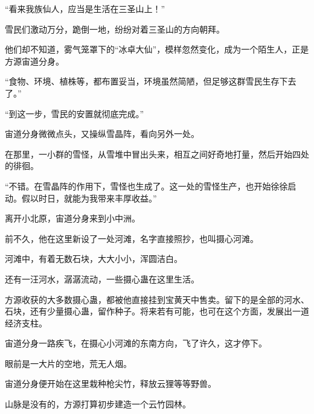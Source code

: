 \begin{this_body}
“看来我族仙人，应当是生活在三圣山上！”

雪民们激动万分，跪倒一地，纷纷对着三圣山的方向朝拜。

他们却不知道，雾气笼罩下的“冰卓大仙”，模样忽然变化，成为一个陌生人，正是方源宙道分身。

“食物、环境、植株等，都布置妥当，环境虽然简陋，但足够这群雪民生存下去了。”

“到这一步，雪民的安置就彻底完成。”

宙道分身微微点头，又操纵雪晶阵，看向另外一处。

在那里，一小群的雪怪，从雪堆中冒出头来，相互之间好奇地打量，然后开始四处的徘徊。

“不错。在雪晶阵的作用下，雪怪也生成了。这一处的雪怪生产，也开始徐徐启动。假以时日，就能为我带来丰厚收益。”

离开小北原，宙道分身来到小中洲。

前不久，他在这里新设了一处河滩，名字直接照抄，也叫摄心河滩。

河滩中，有着无数石块，大大小小，浑圆洁白。

还有一汪河水，潺潺流动，一些摄心蛊在这里生活。

方源收获的大多数摄心蛊，都被他直接挂到宝黄天中售卖。留下的是全部的河水、石块，还有少量摄心蛊，留作种子。将来若有可能，也可在这个方面，发展出一道经济支柱。

宙道分身一路疾飞，在摄心小河滩的东南方向，飞了许久，这才停下。

眼前是一大片的空地，荒无人烟。

宙道分身便开始在这里栽种枪尖竹，释放云狸等等野兽。

山脉是没有的，方源打算初步建造一个云竹园林。

\end{this_body}

